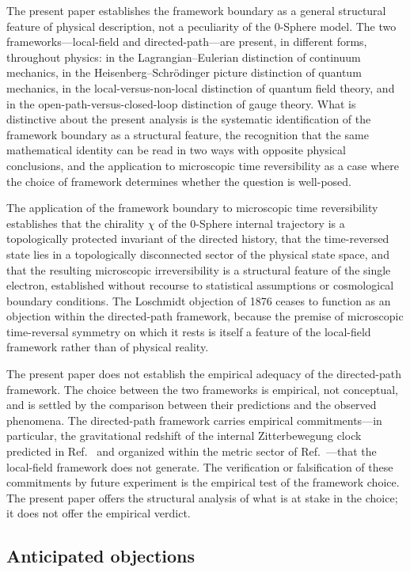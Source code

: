\documentclass[%
 reprint, amsmath,amssymb, aps, prb, ]{revtex4-2}
\numberwithin{equation}{section}
\begin{document}
The present paper establishes the framework boundary as a general structural feature of physical description, not a peculiarity of the 0-Sphere model. The two frameworks---local-field and directed-path---are present, in different forms, throughout physics: in the Lagrangian--Eulerian distinction of continuum mechanics, in the Heisenberg--Schr\"odinger picture distinction of quantum mechanics, in the local-versus-non-local distinction of quantum field theory, and in the open-path-versus-closed-loop distinction of gauge theory. What is distinctive about the present analysis is the systematic identification of the framework boundary as a structural feature, the recognition that the same mathematical identity can be read in two ways with opposite physical conclusions, and the application to microscopic time reversibility as a case where the choice of framework determines whether the question is well-posed.

The application of the framework boundary to microscopic time reversibility establishes that the chirality $\chi$ of the 0-Sphere internal trajectory is a topologically protected invariant of the directed history, that the time-reversed state lies in a topologically disconnected sector of the physical state space, and that the resulting microscopic irreversibility is a structural feature of the single electron, established without recourse to statistical assumptions or cosmological boundary conditions. The Loschmidt objection of 1876 ceases to function as an objection within the directed-path framework, because the premise of microscopic time-reversal symmetry on which it rests is itself a feature of the local-field framework rather than of physical reality.

The present paper does not establish the empirical adequacy of the directed-path framework. The choice between the two frameworks is empirical, not conceptual, and is settled by the comparison between their predictions and the observed phenomena. The directed-path framework carries empirical commitments---in particular, the gravitational redshift of the internal Zitterbewegung clock predicted in Ref.~\cite{hanamura22} and organized within the metric sector of Ref.~\cite{hanamura55}---that the local-field framework does not generate. The verification or falsification of these commitments by future experiment is the empirical test of the framework choice. The present paper offers the structural analysis of what is at stake in the choice; it does not offer the empirical verdict.

\subsection{Anticipated objections}
\label{sec:objections}
\end{document}
